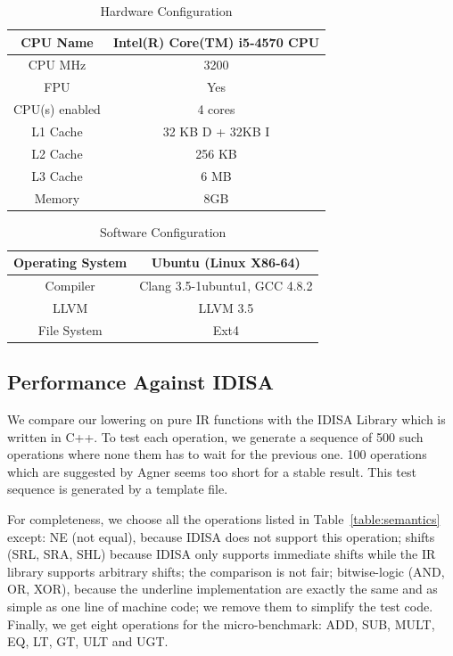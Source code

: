 \begin{table}[h]
\centering
\begin{tabular}{|c|c|}
\hline
CPU Name       & Intel(R) Core(TM) i5-4570 CPU \\ \hline
CPU MHz        & 3200                          \\ \hline
FPU            & Yes                           \\ \hline
CPU(s) enabled & 4 cores                       \\ \hline
L1 Cache       & 32 KB D + 32KB I              \\ \hline
L2 Cache       & 256 KB                        \\ \hline
L3 Cache       & 6 MB                          \\ \hline
Memory         & 8GB                           \\ \hline
\end{tabular}
\caption{Hardware Configuration}
\label{table:hardware_config}
\end{table}

\begin{table}[h]
\centering
\begin{tabular}{|c|c|}
\hline
Operating System & Ubuntu (Linux X86-64)         \\ \hline
Compiler         & Clang 3.5-1ubuntu1, GCC 4.8.2 \\ \hline
LLVM             & LLVM 3.5                      \\ \hline
File System      & Ext4                          \\ \hline
\end{tabular}
\caption{Software Configuration}
\label{table:software_config}
\end{table}

\subsection{Performance Against IDISA}
We compare our lowering on pure IR functions with the IDISA Library \cite{hua_idisa} which is written in C++. To test each operation, we generate a sequence of 500 such operations where none them has to wait for the previous one. 100 operations which are suggested by Agner seems too short for a stable result. This test sequence is generated by a template file.

For completeness, we choose all the operations listed in Table~\ref{table:semantics} except: NE (not equal), because IDISA does not support this operation; shifts (SRL, SRA, SHL) because IDISA only supports immediate shifts while the IR library supports arbitrary shifts; the comparison is not fair; bitwise-logic (AND, OR, XOR), because the underline implementation are exactly the same and as simple as one line of machine code; we remove them to simplify the test code. Finally, we get eight operations for the micro-benchmark: ADD, SUB, MULT, EQ, LT, GT, ULT and UGT.

